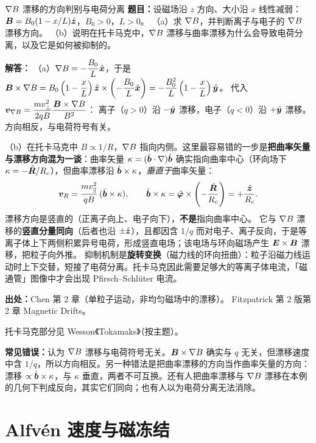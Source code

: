 \begin{example}{$\nabla B$ 漂移的方向判别与电荷分离}{}
\textbf{题目：}设磁场沿 $z$ 方向、大小沿 $x$ 线性减弱：$\bm{B}=B_0(1-x/L)\hat{\bm{z}}$，$B_0>0$，$L>0$。
（a）求 $\nabla B$，并判断离子与电子的 $\nabla B$ 漂移方向。
（b）说明在托卡马克中，$\nabla B$ 漂移与曲率漂移为什么会导致电荷分离，以及它是如何被抑制的。

\textbf{解答：}
（a）$\nabla B=-\dfrac{B_0}{L}\hat{\bm{x}}$，于是
$\bm{B}\times\nabla B=B_0\left(1-\dfrac{x}{L}\right)\hat{\bm{z}}\times\left(-\dfrac{B_0}{L}\hat{\bm{x}}\right)
=-\dfrac{B_0^2}{L}\left(1-\dfrac{x}{L}\right)\hat{\bm{y}}$。
代入 $\bm{v}_{\nabla B}=\dfrac{mv_\perp^2}{2qB}\dfrac{\bm{B}\times\nabla B}{B^2}$：
离子（$q>0$）沿 $-\hat{\bm{y}}$ 漂移，电子（$q<0$）沿 $+\hat{\bm{y}}$ 漂移。方向相反，与电荷符号有关。

（b）在托卡马克中 $B\propto1/R$，$\nabla B$ 指向内侧。这里最容易错的一步是\textbf{把曲率矢量与漂移方向混为一谈}：曲率矢量 $\kappa=(\hat{\bm{b}}\cdot\nabla)\hat{\bm{b}}$ 确实指向曲率中心（环向场下 $\kappa=-\hat{\bm{R}}/R_c$），但曲率漂移沿 $\hat{\bm{b}}\times\kappa$，\emph{垂直于}曲率矢量：
\[
\bm{v}_R=\frac{mv_\parallel^2}{qB}\,(\hat{\bm{b}}\times\kappa),
\qquad
\hat{\bm{b}}\times\kappa=\hat{\bm{\varphi}}\times\left(-\frac{\hat{\bm{R}}}{R_c}\right)=+\frac{\hat{\bm{z}}}{R_c}.
\]
漂移方向是竖直的（正离子向上、电子向下），\textbf{不是}指向曲率中心。
它与 $\nabla B$ 漂移的\textbf{竖直分量同向}（后者也沿 $\pm\hat{\bm{z}}$），且都因含 $1/q$ 而对电子、离子反向，于是等离子体上下两侧积累异号电荷，形成竖直电场；该电场与环向磁场产生 $\bm{E}\times\bm{B}$ 漂移，把粒子向外推。
抑制机制是\textbf{旋转变换}（磁力线的环向扭曲）：粒子沿磁力线运动时上下交替，短接了电荷分离。托卡马克因此需要足够大的等离子体电流，「磁通管」图像中才会出现 Pfirsch--Schl\"uter 电流。

{\footnotesize
\textbf{出处：}Chen 第 2 章（单粒子运动，非均匀磁场中的漂移）。
Fitzpatrick 第 2 版第 2 章 Magnetic Drifts。

托卡马克部分见 Wesson《Tokamaks》（按主题）。
}

\textbf{常见错误：}认为 $\nabla B$ 漂移与电荷符号无关。$\bm{B}\times\nabla B$ 确实与 $q$ 无关，但漂移速度中含 $1/q$，所以方向相反。另一种错法是把曲率漂移的方向当作曲率矢量的方向：漂移 $\propto\hat{\bm{b}}\times\kappa$，与 $\kappa$ 垂直，两者不可互换。还有人把曲率漂移与 $\nabla B$ 漂移在本例的几何下判成反向，其实它们同向；也有人以为电荷分离无法消除。
\end{example}


\section{Alfvén 速度与磁冻结}

